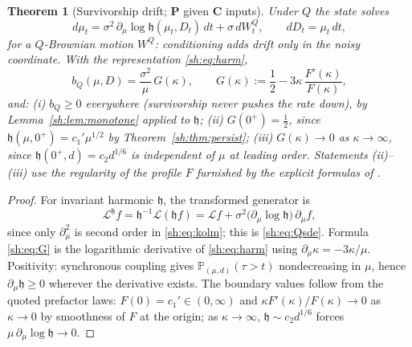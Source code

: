 \documentclass[11pt]{article}
\numberwithin{equation}{section}
\theoremstyle{plain}
\newtheorem{theorem}{Theorem}[section]
\theoremstyle{definition}
\theoremstyle{remark}
\newcommand{\PP}{\mathbb{P}}
\newcommand{\Lc}{\mathcal{L}}
\newcommand{\hm}{\mathfrak{h}}
\begin{document}
\begin{theorem}[Survivorship drift; \textbf{P} given \textbf{C} inputs]
\label{sh:thm:drift}
Under $Q$ the state solves
\begin{equation}\label{sh:eq:Qsde}
d\mu_t=\sigma^2\,\partial_\mu\log\hm(\mu_t,D_t)\,dt+\sigma\,dW^Q_t,
\qquad dD_t=\mu_t\,dt,
\end{equation}
for a $Q$-Brownian motion $W^Q$: conditioning adds drift only in the
noisy coordinate. With the representation \eqref{sh:eq:harm},
\begin{equation}\label{sh:eq:G}
b_Q(\mu,D)=\frac{\sigma^2}{\mu}\,G(\kappa),
\qquad
G(\kappa):=\frac12-3\kappa\,\frac{F'(\kappa)}{F(\kappa)},
\end{equation}
and: \emph{(i)} $b_Q\ge0$ everywhere (survivorship never pushes the rate
down), by Lemma~\ref{sh:lem:monotone} applied to $\hm$;
\emph{(ii)} $G(0^+)=\tfrac12$, since
$\hm(\mu,0^+)=c_1'\mu^{1/2}$ by Theorem~\ref{sh:thm:persist};
\emph{(iii)} $G(\kappa)\to0$ as $\kappa\to\infty$, since
$\hm(0^+,d)=c_2 d^{1/6}$ is independent of $\mu$ at leading order.
Statements (ii)--(iii) use the regularity of the profile $F$ furnished by
the explicit formulas of \cite{GJW99}.
\end{theorem}

\begin{proof}
For invariant harmonic $\hm$, the transformed generator is
\[
\Lc^{\hm}f=\hm^{-1}\Lc(\hm f)
=\Lc f+\sigma^2\bigl(\partial_\mu\log\hm\bigr)\,\partial_\mu f,
\]
since only $\partial_\mu^2$ is second order in
\eqref{sh:eq:kolm}; this is \eqref{sh:eq:Qsde}. Formula \eqref{sh:eq:G}
is the logarithmic derivative of \eqref{sh:eq:harm} using
$\partial_\mu\kappa=-3\kappa/\mu$. Positivity: synchronous coupling gives
$\PP_{(\mu,d)}(\tau>t)$ nondecreasing in $\mu$, hence
$\partial_\mu\hm\ge0$ wherever the derivative exists. The boundary values
follow from the quoted prefactor laws: $F(0)=c_1'\in(0,\infty)$ and
$\kappa F'(\kappa)/F(\kappa)\to0$ as $\kappa\to0$ by smoothness of $F$ at
the origin; as $\kappa\to\infty$, $\hm\sim c_2d^{1/6}$ forces
$\mu\,\partial_\mu\log\hm\to0$.
\end{proof}
\end{document}
